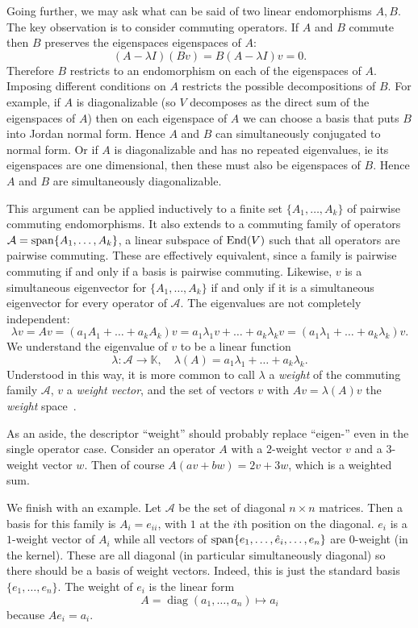 Going further, we may ask what can be said of two linear endomorphisms $A,B$.
The key observation is to consider commuting operators.
If $A$ and $B$ commute then $B$ preserves the eigenspaces  eigenspaces of $A$:
\[
(A- \lambda I) (Bv) 
= B(A- \lambda I) v
= 0.
\]
Therefore $B$ restricts to an endomorphism on each of the eigenspaces of $A$.
Imposing different conditions on $A$ restricts the possible decompositions of $B$.
For example, if $A$ is diagonalizable (so $V$ decomposes as the direct sum of the eigenspaces of $A$) then on each eigenspace of $A$ we can choose a basis that puts $B$ into Jordan normal form.
Hence $A$ and $B$ can simultaneously conjugated to normal form.
Or if $A$ is diagonalizable and has no repeated eigenvalues, ie its eigenspaces are one dimensional, then these must also be eigenspaces of $B$.
Hence $A$ and $B$ are simultaneously diagonalizable.

This argument can be applied inductively to a finite set $\{A_1,\dots,A_k\}$ of pairwise commuting endomorphisms.
It also extends to a commuting family of operators $\mathcal{A} = \operatorname{span}\{A_1,\dots,A_k\}$, a linear subspace of $\operatorname{End}(V)$ such that all operators are pairwise commuting.
These are effectively equivalent, since a family is pairwise commuting if and only if a basis is pairwise commuting.
Likewise, $v$ is a simultaneous eigenvector for $\{A_1,\dots,A_k\}$ if and only if it is a simultaneous eigenvector for every operator of $\mathcal{A}$.
The eigenvalues are not completely independent:
\[
\lambda v
= Av 
= (a_1A_1 + \dots + a_kA_k)v
= a_1 \lambda_1 v + \dots + a_k \lambda_k v
= (a_1 \lambda_1 + \dots + a_k \lambda_k )v.
\]
We understand the eigenvalue of $v$ to be a linear function 
\[
\lambda : \mathcal{A} \to \mathbb{K}, 
\quad
\lambda(A) = a_1 \lambda_1 + \dots + a_k \lambda_k .
\]
Understood in this way, it is more common to call $\lambda$ a \emph{weight} of the commuting family $\mathcal{A}$, $v$ a \emph{weight vector}, and the set of vectors $v$ with $Av = \lambda(A)v$ the \emph{weight} space~\cite[Definition~A.14]{Hall2015}.

As an aside, the descriptor ``weight'' should probably replace ``eigen-'' even in the single operator case.
Consider an operator $A$ with a $2$-weight vector $v$ and a $3$-weight vector $w$.
Then of course $A(av+bw) = 2v + 3w$, which is a weighted sum.

We finish with an example.
Let $\mathcal{A}$ be the set of diagonal $n\times n$ matrices.
Then a basis for this family is $A_i = e_{ii}$, with $1$ at the $i$th position on the diagonal.
$e_i$ is a $1$-weight vector of $A_i$ while all vectors of $\operatorname{span}\{e_1,\dots,\hat{e}_i,\dots,e_n\}$ are $0$-weight (in the kernel).
These are all diagonal (in particular simultaneously diagonal) so there should be a basis of weight vectors.
Indeed, this is just the standard basis $\{e_1,\dots,e_n\}$.
The weight of $e_i$ is the linear form
\[
A = \operatorname{diag}(a_1,\dots,a_n) \mapsto a_i
\]
because $A e_i = a_i$.

